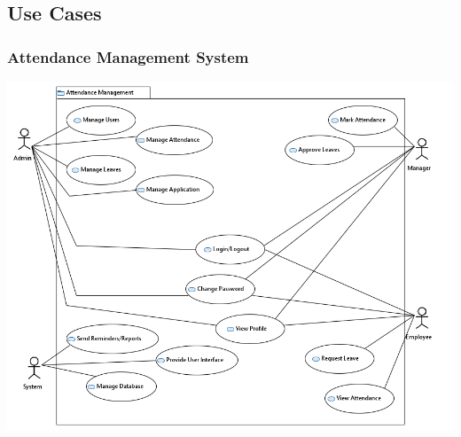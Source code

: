 \documentclass[a4paper, 12pt]{article}
\begin{document}
\subsection{Use Cases}
\subsubsection{Attendance Management System}
\begin{center}
\includegraphics[width=1\textwidth]{Attendance_Management_Use_Case.PNG}\par
\end{center}
\end{document}
